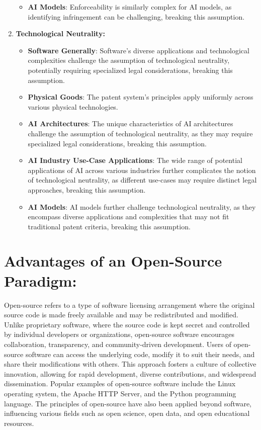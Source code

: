 \documentclass{article}[10pt]
\begin{document}
\begin{enumerate}
\begin{itemize}
    	\item \textbf{AI Models}: Enforceability is similarly complex for AI models, as identifying infringement can be challenging, breaking this assumption.
    \end{itemize}
    \item \textbf{Technological Neutrality:}
    \begin{itemize}
    	\item \textbf{Software Generally}: Software's diverse applications and technological complexities challenge the assumption of technological neutrality, potentially requiring specialized legal considerations, breaking this assumption.
    	\item \textbf{Physical Goods}: The patent system's principles apply uniformly across various physical technologies.
    	\item \textbf{AI Architectures}: The unique characteristics of AI architectures challenge the assumption of technological neutrality, as they may require specialized legal considerations, breaking this assumption.
    	\item \textbf{AI Industry Use-Case Applications}: The wide range of potential applications of AI across various industries further complicates the notion of technological neutrality, as different use-cases may require distinct legal approaches, breaking this assumption.
    	\item \textbf{AI Models}: AI models further challenge technological neutrality, as they encompass diverse applications and complexities that may not fit traditional patent criteria, breaking this assumption.
    \end{itemize}
\end{enumerate}

\section{Advantages of an Open-Source Paradigm:}

Open-source refers to a type of software licensing arrangement where the original source code is made freely available and may be redistributed and modified. Unlike proprietary software, where the source code is kept secret and controlled by individual developers or organizations, open-source software encourages collaboration, transparency, and community-driven development. Users of open-source software can access the underlying code, modify it to suit their needs, and share their modifications with others. This approach fosters a culture of collective innovation, allowing for rapid development, diverse contributions, and widespread dissemination. Popular examples of open-source software include the Linux operating system, the Apache HTTP Server, and the Python programming language. The principles of open-source have also been applied beyond software, influencing various fields such as open science, open data, and open educational resources.
\end{document}
